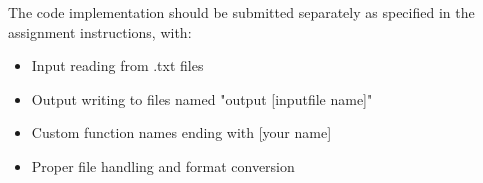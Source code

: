 \documentclass[12pt,a4paper]{article}
\begin{document}
The code implementation should be submitted separately as specified in the assignment instructions, with:
\begin{itemize}
    \item Input reading from .txt files
    \item Output writing to files named "output [inputfile name]"
    \item Custom function names ending with [your name]
    \item Proper file handling and format conversion
\end{itemize}
\end{document}
